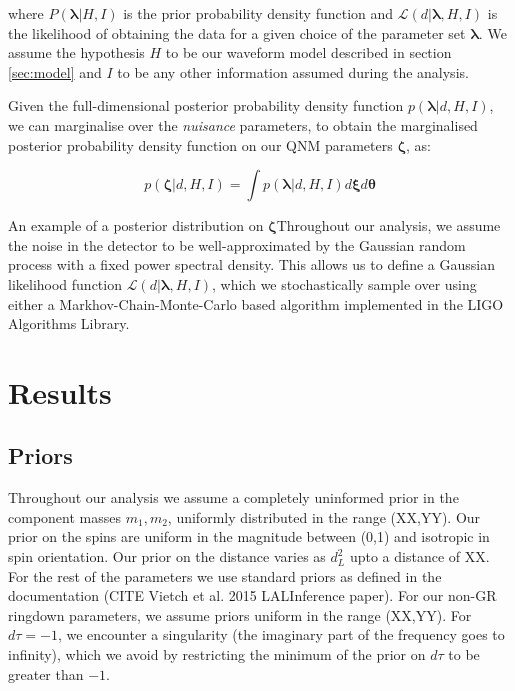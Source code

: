 \documentclass[twocolumn,prd,superscriptaddress,amsfonts,amssymb,amsmath,preprintnumbers]{revtex4-1}
\newcommand{\blambda}{\bm{\lambda}}
\newcommand{\btheta}{\bm{\theta}}
\newcommand{\bxi}{\bm{\xi}}
\newcommand{\bzeta}{\bm{\zeta}}
\begin{document}
where $P(\blambda | H,I)$ is the prior probability density function and $\mathcal{L}(d | \blambda, H, I)$ is the likelihood of obtaining the data for a given choice of the parameter set $\blambda$. We assume the hypothesis $H$ to be our waveform model described in section \ref{sec:model} and $I$ to be any other information assumed during the analysis.

Given the full-dimensional posterior probability density function $p(\blambda | d, H, I)$, we can marginalise over the \emph{nuisance} parameters, to obtain the marginalised posterior probability density function on our QNM parameters $\bzeta$, as:

\begin{equation}
p(\bzeta | d, H, I) = \int p(\blambda | d, H, I) d\bxi d\btheta
\end{equation}

An example of a posterior distribution on $\bzeta$Throughout our analysis, we assume the noise in the detector to be well-approximated by the Gaussian random process with a fixed power spectral density. This allows us to define a Gaussian likelihood function $\mathcal{L}(d | \blambda, H, I)$, which we stochastically sample over using either a Markhov-Chain-Monte-Carlo based algorithm implemented in the LIGO Algorithms Library.

\section{Results}\label{sec:results}

\iffalse
\subsection{Priors}

Throughout our analysis we assume a completely uninformed prior in the component masses $m_1, m_2$, uniformly distributed in the range (XX,YY). Our prior on the spins are uniform in the magnitude between (0,1) and isotropic in spin orientation. Our prior on the distance varies as $d_L^2$ upto a distance of XX. For the rest of the parameters we use standard priors as defined in the documentation (CITE Vietch et al. 2015 LALInference paper). For our non-GR ringdown parameters, we assume priors uniform in the range (XX,YY). For $d\tau = -1$, we encounter a singularity (the imaginary part of the frequency goes to infinity), which we avoid by restricting the minimum of the prior on $d\tau$ to be greater than $-1$.
\end{document}
